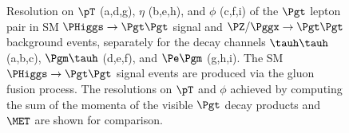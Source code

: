 \begin{figure}
\caption{
  Resolution on $\pT$ (a,d,g), $\eta$ (b,e,h), and $\phi$ (c,f,i) of the $\Pgt$ lepton
  pair in SM $\PHiggs \to \Pgt\Pgt$ signal and $\PZ/\Pggx \to
  \Pgt\Pgt$ background events,
  separately for the decay channels $\tauh\tauh$ (a,b,c), $\Pgm\tauh$ (d,e,f),
  and $\Pe\Pgm$ (g,h,i).
  The SM $\PHiggs \to \Pgt\Pgt$ signal events are produced via the
  gluon fusion process.
  The resolutions on $\pT$ and $\phi$ achieved by computing the sum of
  the momenta of the visible $\Pgt$ decay products and $\MET$ are shown for comparison.
}
\label{fig:resolutions_sm_pT_eta_and_phi}
\end{figure}

